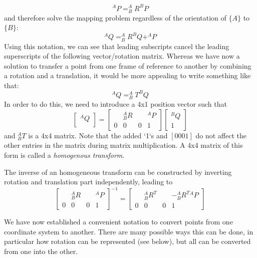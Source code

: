 \begin{equation}
^AP=^A_BR^BP
\end{equation}
%
and therefore solve the mapping problem regardless of the orientation of $\{A\}$ to $\{B\}$:
\begin{equation}
^AQ=^A_BR^BQ+^AP
\end{equation}
Using this notation, we can see that leading subscripts cancel the leading superscripts of the following vector/rotation matrix. Whereas we have now a solution to transfer a point from one frame of reference to another by combining a rotation and a translation, it would be more appealing to write something like that:
\begin{equation}
^AQ=^A_BT^BQ
\end{equation}
In order to do this, we need to introduce a 4x1 position vector such that
\begin{equation}
\left[\begin{array}{c}^AQ\\\end{array}\right]=\left[\begin{array}{ccc|c} & ^A_BR & & ^AP \\\hline 0 & 0 & 0 & 1\end{array}\right]\left[\begin{array}{c}^BQ\\1\end{array}\right]
\end{equation}
and $^A_BT$ is a 4x4 matrix.  Note that the added `1`s and $ [0 0 0 1]$ do not affect the other entries in the matrix during matrix multiplication. A 4x4 matrix of this form is called a \emph{homogenous transform}.

The inverse of an homogeneous transform can be constructed by inverting rotation and translation part independently, leading to
\begin{equation}
\left[\begin{array}{ccc|c} & ^A_BR & & ^AP \\\hline 0 & 0 & 0 & 1\end{array}\right]^{-1}=
\left[\begin{array}{ccc|c} & ^A_BR^T & & -^A_B{R^T}{^AP} \\\hline 0 & 0 & 0 & 1\end{array}\right]
\end{equation}

We have now established a convenient notation to convert points from one coordinate system to another. There are many possible ways this can be done, in particular how rotation can be represented (see below), but all can be converted from one into the other.

